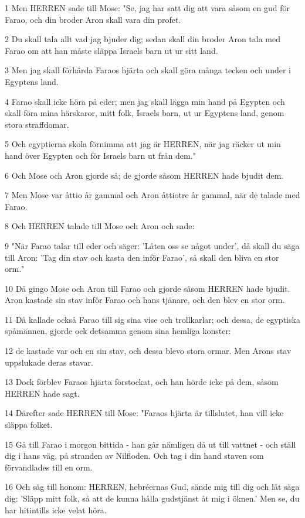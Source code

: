 \par 1 Men HERREN sade till Mose: "Se, jag har satt dig att vara såsom en gud för Farao, och din broder Aron skall vara din profet.
\par 2 Du skall tala allt vad jag bjuder dig; sedan skall din broder Aron tala med Farao om att han måste släppa Israels barn ut ur sitt land.
\par 3 Men jag skall förhärda Faraos hjärta och skall göra många tecken och under i Egyptens land.
\par 4 Farao skall icke höra på eder; men jag skall lägga min hand på Egypten och skall föra mina härskaror, mitt folk, Israels barn, ut ur Egyptens land, genom stora straffdomar.
\par 5 Och egyptierna skola förnimma att jag är HERREN, när jag räcker ut min hand över Egypten och för Israels barn ut från dem."
\par 6 Och Mose och Aron gjorde så; de gjorde såsom HERREN hade bjudit dem.
\par 7 Men Mose var åttio år gammal och Aron åttiotre år gammal, när de talade med Farao.
\par 8 Och HERREN talade till Mose och Aron och sade:
\par 9 "När Farao talar till eder och säger: 'Låten oss se något under', då skall du säga till Aron: 'Tag din stav och kasta den inför Farao', så skall den bliva en stor orm."
\par 10 Då gingo Mose och Aron till Farao och gjorde såsom HERREN hade bjudit. Aron kastade sin stav inför Farao och hans tjänare, och den blev en stor orm.
\par 11 Då kallade också Farao till sig sina vise och trollkarlar; och dessa, de egyptiska spåmännen, gjorde ock detsamma genom sina hemliga konster:
\par 12 de kastade var och en sin stav, och dessa blevo stora ormar. Men Arons stav uppslukade deras stavar.
\par 13 Dock förblev Faraos hjärta förstockat, och han hörde icke på dem, såsom HERREN hade sagt.
\par 14 Därefter sade HERREN till Mose: "Faraos hjärta är tillslutet, han vill icke släppa folket.
\par 15 Gå till Farao i morgon bittida - han går nämligen då ut till vattnet - och ställ dig i hans väg, på stranden av Nilfloden. Och tag i din hand staven som förvandlades till en orm.
\par 16 Och säg till honom: HERREN, hebréernas Gud, sände mig till dig och lät säga dig: 'Släpp mitt folk, så att de kunna hålla gudstjänst åt mig i öknen.' Men se, du har hitintills icke velat höra.
